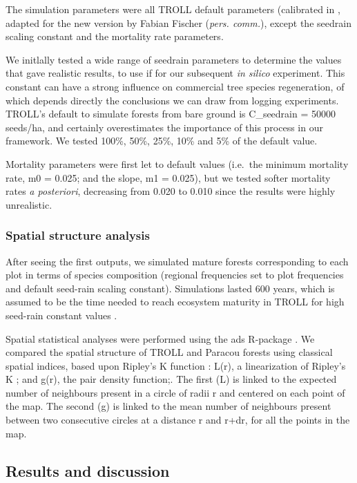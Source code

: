 \documentclass[12pt,]{article}
\theoremstyle{definition}
\theoremstyle{definition}
\theoremstyle{definition}
\theoremstyle{remark}
\begin{document}
The simulation parameters were all TROLL default parameters (calibrated
in \citet{Marechaux2017}, adapted for the new version by Fabian Fischer
(\emph{pers. comm.}), except the seedrain scaling constant and the
mortality rate parameters.

We initlally tested a wide range of seedrain parameters to determine the
values that gave realistic results, to use if for our subsequent
\emph{in silico} experiment. This constant can have a strong influence
on commercial tree species regeneration, of which depends directly the
conclusions we can draw from logging experiments. TROLL's default to
simulate forests from bare ground is C\_seedrain = 50000 seeds/ha, and
certainly overestimates the importance of this process in our framework.
We tested 100\%, 50\%, 25\%, 10\% and 5\% of the default value.

Mortality parameters were first let to default values (i.e.~the minimum
mortality rate, m0 = 0.025; and the slope, m1 = 0.025), but we tested
softer mortality rates \emph{a posteriori}, decreasing from 0.020 to
0.010 since the results were highly unrealistic.

\subsubsection{Spatial structure
analysis}\label{spatial-structure-analysis}

After seeing the first outputs, we simulated mature forests
corresponding to each plot in terms of species composition (regional
frequencies set to plot frequencies and default seed-rain scaling
constant). Simulations lasted 600 years, which is assumed to be the time
needed to reach ecosystem maturity in TROLL for high seed-rain constant
values \citep{Marechaux2017}.

Spatial statistical analyses were performed using the ads R-package
\citep{Amap2015}. We compared the spatial structure of TROLL and Paracou
forests using classical spatial indices, based upon Ripley's K function
\citep{Ripley1977}: L(r), a linearization of Ripley's K
\citep{Besag1977}; and g(r), the pair density function;. The first (L)
is linked to the expected number of neighbours present in a circle of
radii r and centered on each point of the map. The second (g) is linked
to the mean number of neighbours present between two consecutive circles
at a distance r and r+dr, for all the points in the map.

\subsection{Results and discussion}\label{results-and-discussion}
\end{document}
